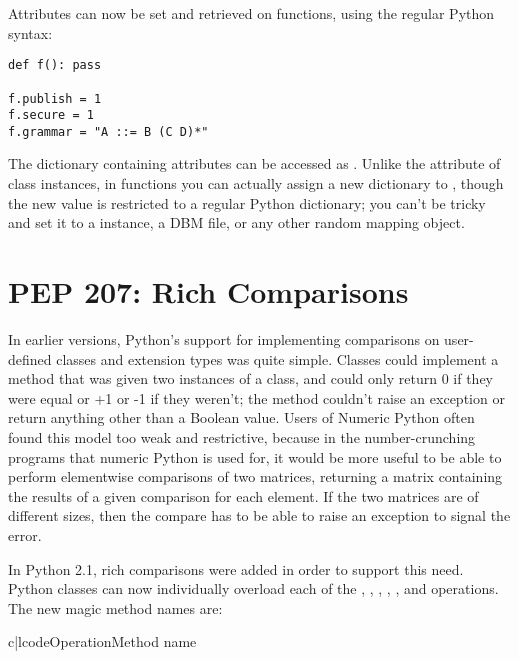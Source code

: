 \documentclass{howto}
\begin{document}
Attributes can now be set and retrieved on functions, using the
regular Python syntax:

\begin{verbatim}
def f(): pass

f.publish = 1
f.secure = 1
f.grammar = "A ::= B (C D)*"
\end{verbatim}    

The dictionary containing attributes can be accessed as
. Unlike the  attribute of
class instances, in functions you can actually assign a new dictionary
to , though the new value is restricted to a
regular Python dictionary; you can't be tricky and set it to a
 instance, a DBM file, or any other random mapping
object.

\begin{seealso}


\end{seealso}

\section{PEP 207: Rich Comparisons}

In earlier versions, Python's support for implementing comparisons on
user-defined classes and extension types was quite simple. Classes
could implement a  method that was given two instances
of a class, and could only return 0 if they were equal or +1 or -1 if
they weren't; the method couldn't raise an exception or return
anything other than a Boolean value.  Users of Numeric Python often
found this model too weak and restrictive, because in the
number-crunching programs that numeric Python is used for, it would be
more useful to be able to perform elementwise comparisons of two
matrices, returning a matrix containing the results of a given
comparison for each element.  If the two matrices are of different
sizes, then the compare has to be able to raise an exception to signal
the error.

In Python 2.1, rich comparisons were added in order to support this need.
Python classes can now individually overload each of the \code{<},
\code{<=}, \code{>}, \code{>=}, \code{==}, and \code{!=} operations.
The new magic method names are:

\begin{tableii}{c|l}{code}{Operation}{Method name}
\end{tableii}
\end{document}
